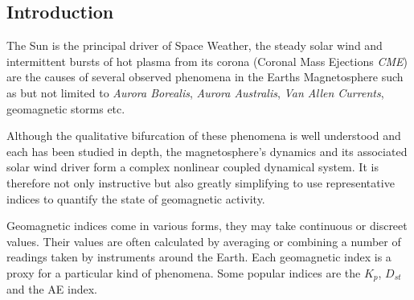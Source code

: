 \documentclass[referee,a4paper,12pt,traditabstract]{swsc}
\begin{document}
\begin{linenumbers}

   \maketitle

\section{Introduction}

The Sun is the principal driver of Space Weather, the steady solar wind and intermittent bursts of hot plasma from its corona (Coronal Mass Ejections \emph{CME}) are the causes of several observed phenomena in the Earths Magnetosphere such as but not limited to \emph{Aurora Borealis}, \emph{Aurora Australis}, \emph{Van Allen Currents}, geomagnetic storms etc.

Although the qualitative bifurcation of these phenomena is well understood and each has been studied in depth, the magnetosphere's dynamics and its associated solar wind driver form a complex nonlinear coupled dynamical system. It is therefore not only instructive but also greatly simplifying to use representative indices to quantify the state of geomagnetic activity.

Geomagnetic indices come in various forms, they may take continuous or discreet values. Their values are often calculated by averaging or combining a number of readings taken by instruments around the Earth. Each geomagnetic index is a proxy for a particular kind of phenomena. Some popular indices are the $K_p$, $D_{st}$ and the AE index.

\end{linenumbers}
\end{document}
